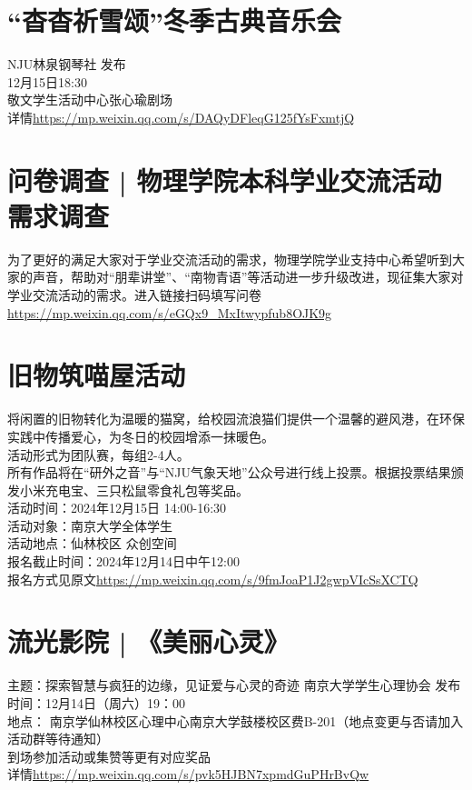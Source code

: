 \documentclass[letterpaper, 12pt]{article}
\begin{document}
\begin{multicols}{2}
\section{“杳杳祈雪颂”冬季古典音乐会}
NJU林泉钢琴社 发布\\
12月15日18:30\\
敬文学生活动中心张心瑜剧场\\
详情\url{https://mp.weixin.qq.com/s/DAQyDFleqG125fYsFxmtjQ}\\

\section{问卷调查 | 物理学院本科学业交流活动需求调查}
为了更好的满足大家对于学业交流活动的需求，物理学院学业支持中心希望听到大家的声音，帮助对“朋辈讲堂”、“南物青语”等活动进一步升级改进，现征集大家对学业交流活动的需求。进入链接扫码填写问卷\url{https://mp.weixin.qq.com/s/eGQx9_MxItwypfub8OJK9g}

\section{旧物筑喵屋活动}
将闲置的旧物转化为温暖的猫窝，给校园流浪猫们提供一个温馨的避风港，在环保实践中传播爱心，为冬日的校园增添一抹暖色。\\
活动形式为团队赛，每组2-4人。\\
所有作品将在“研外之音”与“NJU气象天地”公众号进行线上投票。根据投票结果颁发小米充电宝、三只松鼠零食礼包等奖品。\\
活动时间：2024年12月15日 14:00-16:30\\
活动对象：南京大学全体学生\\
活动地点：仙林校区 众创空间\\
报名截止时间：2024年12月14日中午12:00\\
报名方式见原文\url{https://mp.weixin.qq.com/s/9fmJoaP1J2gwpVIcSsXCTQ}


\section{流光影院 | 《美丽心灵》}
主题：探索智慧与疯狂的边缘，见证爱与心灵的奇迹
南京大学学生心理协会 发布\\
时间：12月14日（周六）19：00\\
地点： 南京学仙林校区心理中心南京大学鼓楼校区费B-201（地点变更与否请加入活动群等待通知）\\
到场参加活动或集赞等更有对应奖品\\
详情\url{https://mp.weixin.qq.com/s/pvk5HJBN7xpmdGuPHrBvQw}\\



\end{multicols}
\end{document}
